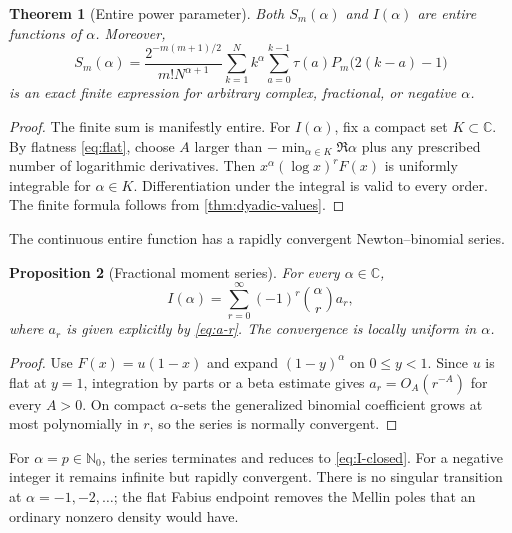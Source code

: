 \documentclass[11pt]{article}
\newtheorem{theorem}{Theorem}[section]
\newtheorem{proposition}[theorem]{Proposition}
\theoremstyle{definition}
\theoremstyle{remark}
\newcommand{\N}{\mathbb N}
\newcommand{\C}{\mathbb C}
\newcommand{\tm}{\tau}
\begin{document}
\begin{theorem}[Entire power parameter]\label{thm:entire-alpha}
Both $S_m(\alpha)$ and $I(\alpha)$ are entire functions of $\alpha$.  Moreover,
\begin{equation}\label{eq:fractional-finite}
 S_m(\alpha)=
 \frac{2^{-m(m+1)/2}}{m!N^{\alpha+1}}
 \sum_{k=1}^{N}k^\alpha
 \sum_{a=0}^{k-1}\tm(a)P_m\bigl(2(k-a)-1\bigr)
\end{equation}
is an exact finite expression for arbitrary complex, fractional, or negative
$\alpha$.
\end{theorem}

\begin{proof}
The finite sum is manifestly entire.  For $I(\alpha)$, fix a compact set
$K\subset\C$.  By flatness \eqref{eq:flat}, choose $A$ larger than
$-\min_{\alpha\in K}\Re\alpha$ plus any prescribed number of logarithmic
derivatives.  Then $x^\alpha(\log x)^rF(x)$ is uniformly integrable for
$\alpha\in K$.  Differentiation under the integral is valid to every order.
The finite formula follows from \cref{thm:dyadic-values}.
\end{proof}

The continuous entire function has a rapidly convergent Newton--binomial
series.

\begin{proposition}[Fractional moment series]\label{prop:fractional-series}
For every $\alpha\in\C$,
\begin{equation}\label{eq:I-alpha-series}
 I(\alpha)=\sum_{r=0}^{\infty}(-1)^r\binom{\alpha}{r}a_r,
\end{equation}
where $a_r$ is given explicitly by \eqref{eq:a-r}.  The convergence is locally
uniform in $\alpha$.
\end{proposition}

\begin{proof}
Use $F(x)=u(1-x)$ and expand $(1-y)^\alpha$ on $0\le y<1$.  Since $u$ is flat
at $y=1$, integration by parts or a beta estimate gives
$a_r=O_A(r^{-A})$ for every $A>0$.  On compact $\alpha$-sets the generalized
binomial coefficient grows at most polynomially in $r$, so the series is
normally convergent.
\end{proof}

For $\alpha=p\in\N_0$, the series terminates and reduces to
\eqref{eq:I-closed}.  For a negative integer it remains infinite but rapidly
convergent.  There is no singular transition at $\alpha=-1,-2,\ldots$; the
flat Fabius endpoint removes the Mellin poles that an ordinary nonzero density
would have.
\end{document}
